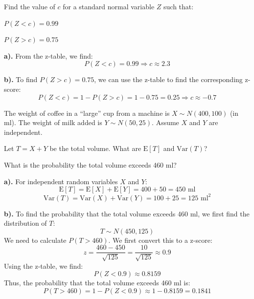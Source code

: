 \documentclass[a4paper, 10pt]{article}
\begin{document}
\begin{problem}
Find the value of \( c \) for a standard normal variable \( Z \) such that:
\begin{subproblems}
    \item \( P(Z < c) = 0.99 \)
    \item \( P(Z > c) = 0.75 \)
\end{subproblems}
\end{problem}

\begin{solution}
\textbf{a).} From the z-table, we find:
\[ P(Z < c) = 0.99 \Rightarrow c \approx \boxed{2.3} \]

\textbf{b).} To find \( P(Z > c) = 0.75 \), we can use the z-table to find the corresponding z-score:
\[ P(Z < c) = 1 - P(Z > c) = 1 - 0.75 = 0.25 \Rightarrow c \approx \boxed{-0.7} \]
\end{solution}

\newpage

\begin{problem}
The weight of coffee in a ``large'' cup from a machine is \( X \sim N(400, 100) \) (in ml).
The weight of milk added is \( Y \sim N(50, 25) \). Assume \( X \) and \( Y \) are independent.
\begin{subproblems}
    \item Let \( T = X + Y \) be the total volume. What are \( \text{E}[T] \) and \( \text{Var}(T) \)?
    \item  What is the probability the total volume exceeds 460 ml?
\end{subproblems}
\end{problem}

\begin{solution}
\textbf{a).} For independent random variables \( X \) and \( Y \):
\[ \text{E}[T] = \text{E}[X] + \text{E}[Y] = 400 + 50 = \boxed{450 \text{ ml}} \]
\[ \text{Var}(T) = \text{Var}(X) + \text{Var}(Y) = 100 + 25 = \boxed{125 \text{ ml}^2} \]

\textbf{b).} To find the probability that the total volume exceeds 460 ml, we first find the distribution of \( T \):
\[ T \sim N(450, 125) \]
We need to calculate \( P(T > 460) \). We first convert this to a z-score:
\[ z = \frac{460 - 450}{\sqrt{125}} = \frac{10}{\sqrt{125}} \approx 0.9 \]
Using the z-table, we find:
\[ P(Z < 0.9) \approx 0.8159 \]
Thus, the probability that the total volume exceeds 460 ml is:
\[ P(T > 460) = 1 - P(Z < 0.9) \approx 1 - 0.8159 = \boxed{0.1841} \]
\end{solution}
\end{document}

